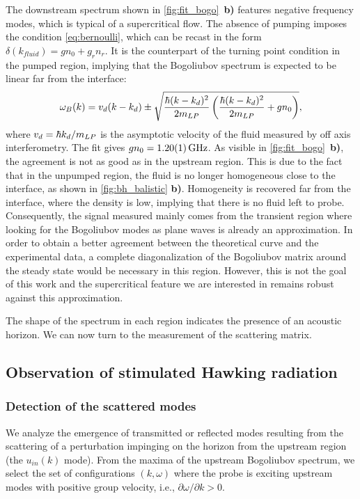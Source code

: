 The downstream spectrum shown in \autoref{fig:fit_bogo}~\textbf{b)} features negative frequency modes, which is typical of a supercritical flow.
The absence of pumping imposes the condition \ref{eq:bernoulli}, which can be recast in the form $\delta(k_{fluid})=gn_0+g_rn_r$. It is the counterpart of the turning point condition in the pumped region, implying that the Bogoliubov spectrum is expected to be linear far from the interface:
\begin{equation}
    \omega_B(k) = v_d(k-k_d) \pm \sqrt{\dfrac{\hbar (k-k_d)^2}{2m_{LP}} \left({\dfrac{\hbar (k-k_d)^2}{2m_{LP}}} + g n_0 \right)},
\end{equation}
where $v_d = \hbar k_d/m_{LP}$ is the asymptotic velocity of the fluid measured by off axis interferometry. The fit gives $gn_0=\SI{1.2 \pm 0.01}{\giga \hertz}$. As visible in \autoref{fig:fit_bogo}~\textbf{b)}, the agreement is not as good as in the upstream region. 
This is due to the fact that in the unpumped region, the fluid is no longer homogeneous close to the interface, as shown in \autoref{fig:bh_balistic} \textbf{b)}.
Homogeneity is recovered far from the interface, where the density is low, implying that there is no fluid left to probe.
Consequently, the signal measured mainly comes from the transient region where looking for the Bogoliubov modes as plane waves is already an approximation.
In order to obtain a better agreement between the theoretical curve and the experimental data, a complete diagonalization of the Bogoliubov matrix around the steady state would be necessary in this region. However, this is not the goal of this work and the supercritical feature we are interested in
remains robust against this approximation.

The shape of the spectrum in each region indicates the presence of an acoustic horizon.
We can now turn to the measurement of the scattering matrix.

\subsection{Observation of stimulated Hawking radiation}
\label{sec:scattering_matrix}

\subsubsection{Detection of the scattered modes}

We analyze the emergence of transmitted or reflected modes resulting from the scattering of a perturbation impinging on the horizon from the upstream region (the \( u_{in}(k) \) mode). 
From the maxima of the upstream Bogoliubov spectrum, we select the set of configurations \((k, \omega)\) where the probe is exciting upstream modes with positive group velocity, i.e., \(\partial\omega/\partial k > 0\). 

